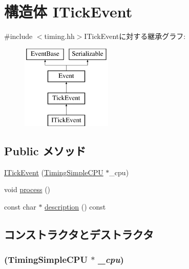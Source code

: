 \hypertarget{structTimingSimpleCPU_1_1IcachePort_1_1ITickEvent}{
\section{構造体 ITickEvent}
\label{structTimingSimpleCPU_1_1IcachePort_1_1ITickEvent}
}


{\ttfamily \#include $<$timing.hh$>$}ITickEventに対する継承グラフ:\begin{figure}[H]
\begin{center}
\leavevmode
\includegraphics[height=4cm]{structTimingSimpleCPU_1_1IcachePort_1_1ITickEvent}
\end{center}
\end{figure}
\subsection*{Public メソッド}
\begin{DoxyCompactItemize}
\item 
\hyperlink{structTimingSimpleCPU_1_1IcachePort_1_1ITickEvent_ad5fed2286e3a04d406b98bc92d273390}{ITickEvent} (\hyperlink{classTimingSimpleCPU_1_1TimingSimpleCPU}{TimingSimpleCPU} $\ast$\_\-cpu)
\item 
void \hyperlink{structTimingSimpleCPU_1_1IcachePort_1_1ITickEvent_a2e9c5136d19b1a95fc427e0852deab5c}{process} ()
\item 
const char $\ast$ \hyperlink{structTimingSimpleCPU_1_1IcachePort_1_1ITickEvent_a2bd90422eece9190794479e08092a252}{description} () const 
\end{DoxyCompactItemize}


\subsection{コンストラクタとデストラクタ}
\hypertarget{structTimingSimpleCPU_1_1IcachePort_1_1ITickEvent_ad5fed2286e3a04d406b98bc92d273390}{
\subsubsection[{ITickEvent}]{ ({\bf TimingSimpleCPU} $\ast$ {\em \_\-cpu})}}
\label{structTimingSimpleCPU_1_1IcachePort_1_1ITickEvent_ad5fed2286e3a04d406b98bc92d273390}



